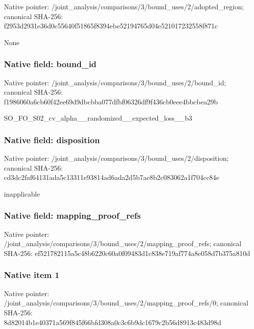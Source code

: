 \documentclass[10pt,a4paper]{article}
\begin{document}
Native pointer: /joint\_analysis/comparis\allowbreak{}ons/3/bound\_uses/2/adopt\allowbreak{}ed\_region; canonical SHA-256: f2953d2931e36d0c55640f51\allowbreak{}865f8394ebe52194765d04e5\allowbreak{}21017232558f871c


None


\subsubsection{Native field: bound\_id}


Native pointer: /joint\_analysis/comparis\allowbreak{}ons/3/bound\_uses/2/bound\allowbreak{}\_id; canonical SHA-256: f1986060a6cb60f42ee69d9d\allowbreak{}bcbba077dfbf06326df9f436\allowbreak{}cb0eee4bbcbea29b


SO\_FO\_S02\_cv\_alpha\_\_rand\allowbreak{}omized\_\_expected\_loss\_\_b\allowbreak{}3


\subsubsection{Native field: disposition}


Native pointer: /joint\_analysis/comparis\allowbreak{}ons/3/bound\_uses/2/dispo\allowbreak{}sition; canonical SHA-256: cd3dc2faf64131ada5c13311\allowbreak{}e93814ad6ada2d5b7ae8b2c0\allowbreak{}83062a1f704cc84e


inapplicable


\subsubsection{Native field: mapping\_proof\_refs}


Native pointer: /joint\_analysis/comparis\allowbreak{}ons/3/bound\_uses/2/mappi\allowbreak{}ng\_proof\_refs; canonical SHA-256: ef521782115a5c48b6220c60\allowbreak{}a0f09483d1c838e719af774a\allowbreak{}8e058d7b375a810d



\subsubsection{Native item 1}


Native pointer: /joint\_analysis/comparis\allowbreak{}ons/3/bound\_uses/2/mappi\allowbreak{}ng\_proof\_refs/0; canonical SHA-256: 8d82014b1e40371a569f845f\allowbreak{}66bfd308a0c3c6b9dc1679c2\allowbreak{}b56d8913c483d98d
\end{document}
